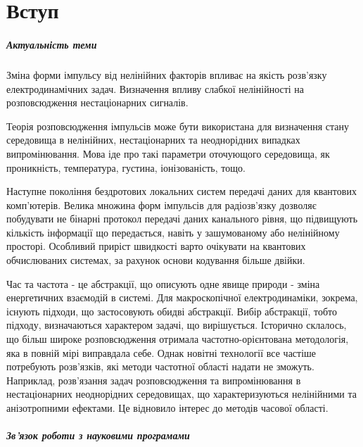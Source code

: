 \chapter*{Вступ}

\paragraph{Актуальність теми}

Зміна форми імпульсу від нелінійних факторів впливає на якість розв'язку 
електродинамічних задач. Визначення впливу слабкої нелінійності на 
розповсюдження нестаціонарних сигналів.

Теорія розповсюдження імпульсів може бути використана для визначення 
стану середовища в нелінійних, нестаціонарних та неоднорідних випадках
випромінювання. Мова іде про такі параметри оточующого середовища, як 
проникність, температура, густина, іонізованість, тощо.

Наступне покоління бездротових локальних систем передачі даних для 
квантових комп'ютерів. Велика множина форм імпульсів для радіозв'язку 
дозволяє побудувати не бінарні протокол передачі даних канального рівня,
що підвищують кількість інформації що передається, навіть у зашумованому або 
нелінійному просторі. Особливий приріст швидкості варто очікувати на 
квантових обчислюваних системах, за рахунок основи кодування більше двійки.

Час та частота - це абстракції, що описують одне явище природи - зміна
енергетичних взаємодій в системі. Для макроскопічної електродинаміки, зокрема,
існують підходи, що застосовують обидві абстракції. Вибір абстракції, тобто 
підходу, визначаються характером задачі, що вирішується. Історично склалось, що
більш широке розповсюдження отримала частотно-орієнтована методологія, яка в 
повній мірі виправдала себе. Однак новітні технології все частіше потребують 
розв'язків, які методи частотної області надати не зможуть. Наприклад, 
розв'язання задач розповсюдження та випромінювання в нестаціонарних 
неоднорідних середовищах, що характеризуються нелінійними та анізотропними 
ефектами. Це відновило інтерес до методів часової області.

\paragraph{Зв'язок роботи з науковими програмами}

